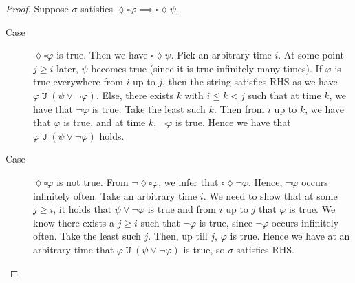 \documentclass[letterpaper,11pt]{article}
\newcommand{\eventually}{\lozenge}
\newcommand{\always}{\square}
\DeclareMathOperator{\untilOp}{\mathtt{U}}
\newcommand{\until}{\untilOp{}}
\begin{document}
\begin{enumerate}
        \begin{proof}
            Suppose $\sigma$ satisfies
            $\eventually \always \varphi \implies \always \eventually \psi$.
            \begin{description}
                \item[Case] $\eventually \always \varphi$ is true.
                    Then we have $\always \eventually \psi$. Pick an arbitrary
                    time $i$. At some point $j \geq i$ later, $\psi$ becomes
                    true (since it is true infinitely many times).  If
                    $\varphi$ is true everywhere from $i$ up to $j$, then the
                    string satisfies RHS as we have $\varphi \until (\psi \lor
                    \neg \varphi)$.  Else, there exists $k$ with $i \leq k < j$
                    such that at time $k$, we have that $\neg \varphi$ is true.
                    Take the least such $k$. Then from $i$ up to $k$, we have
                    that $\varphi$ is true, and at time $k$, $\neg \varphi$ is
                    true.  Hence we have that $\varphi \until (\psi \lor \neg
                    \varphi)$ holds.

                \item[Case] $\eventually \always \varphi$ is not true.
                    From $\neg \eventually \always \varphi$,
                    we infer that $\always \eventually \neg \varphi$.
                    Hence, $\neg \varphi$ occurs infinitely often.
                    Take an arbitrary time $i$. We need to show that at some
                    $j \geq i$, it holds that $\psi \lor \neg \varphi$ is true
                    and from $i$ up to $j$ that $\varphi$ is true.
                    We know there exists a $j \geq i$ such that $\neg \varphi$
                    is true, since $\neg \varphi$ occurs infinitely often. Take
                    the least such $j$. Then, up till $j$, $\varphi$ is true.
                    Hence we have at an arbitrary time that
                    $\varphi \until (\psi \lor \neg \varphi)$ is true, so
                    $\sigma$ satisfies RHS.
            \end{description}


\end{proof}
\end{enumerate}
\end{document}
